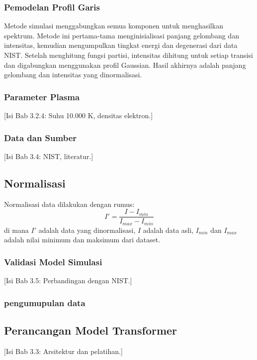 \subsubsection{Pemodelan Profil Garis}
Metode simulasi menggabungkan semua komponen untuk menghasilkan spektrum. Metode ini pertama-tama menginisialisasi panjang gelombang dan intensitas, kemudian mengumpulkan tingkat energi dan degenerasi dari data NIST. Setelah menghitung fungsi partisi, intensitas dihitung untuk setiap transisi dan digabungkan menggunakan profil Gaussian. Hasil akhirnya adalah panjang gelombang dan intensitas yang dinormalisasi.

\subsubsection{Parameter Plasma}
[Isi Bab 3.2.4: Suhu 10.000 K, densitas elektron.]
\subsubsection{Data dan Sumber}
[Isi Bab 3.4: NIST, literatur.]

\subsection{Normalisasi}
\par Normalisasi data dilakukan dengan rumus:
\begin{equation}
    I' = \frac{I - I_{min}}{I_{max} - I_{min}}
\end{equation}
di mana $I'$ adalah data yang dinormalisasi, $I$ adalah data asli, $I_{min}$ dan $I_{max}$ adalah nilai minimum dan maksimum dari dataset.
\subsubsection{Validasi Model Simulasi}
[Isi Bab 3.5: Perbandingan dengan NIST.]

\subsubsection{pengumupulan data}


\subsection{Perancangan Model Transformer}
[Isi Bab 3.3: Arsitektur dan pelatihan.]


